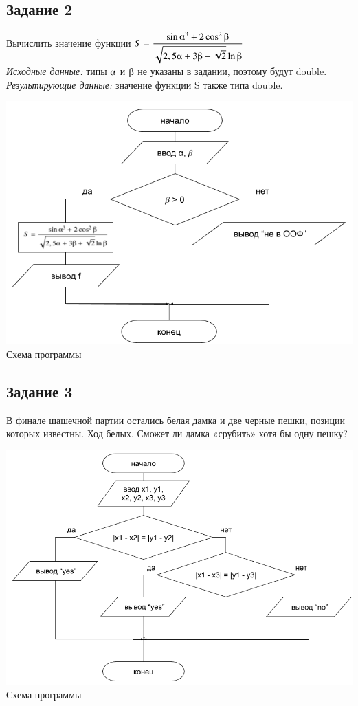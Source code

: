 \documentclass[a4paper,14pt]{extarticle}
\begin{document}
\subsection{Задание 2}
Вычислить значение функции
$S = \displaystyle\frac{ \sin \alphaup^3 + 2\cos^2\betaup }{\sqrt{2,5\alphaup + 3\betaup  + \sqrt{2}}\ln \betaup }$\\
\textit{Исходные данные:} типы $\alphaup$ и $\betaup$ не указаны в задании, поэтому будут double.\\
\textit{Результирующие данные:} значение функции S также типа double.
\vspace{0.5cm}
\begin{center}
\includegraphics[scale=0.6]{lab2-2.png}
Схема программы
\end{center}


\subsection{Задание 3}
В финале шашечной партии остались белая дамка и две черные пешки, позиции которых известны. Ход белых. Сможет ли дамка «срубить» хотя бы одну пешку?
\begin{center}
\includegraphics[scale=0.6]{lab2-3.png}\\
Схема программы
\end{center}

\end{document}
